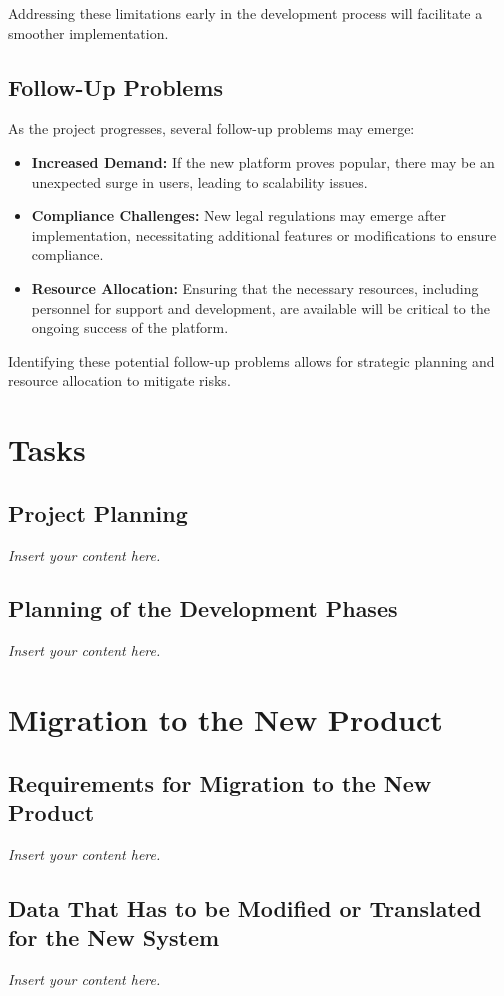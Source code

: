 \documentclass[12pt]{article}
\newcommand{\lips}{\textit{Insert your content here.}}
\begin{document}
Addressing these limitations early in the development process will facilitate a smoother implementation.

\subsection{Follow-Up Problems}
As the project progresses, several follow-up problems may emerge:

\begin{itemize}
    \item \textbf{Increased Demand:} If the new platform proves popular, there may be an unexpected surge in users, leading to scalability issues.
    \item \textbf{Compliance Challenges:} New legal regulations may emerge after implementation, necessitating additional features or modifications to ensure compliance.
    \item \textbf{Resource Allocation:} Ensuring that the necessary resources, including personnel for support and development, are available will be critical to the ongoing success of the platform.
\end{itemize}

Identifying these potential follow-up problems allows for strategic planning and resource allocation to mitigate risks.


\section{Tasks}
\subsection{Project Planning}
\lips
\subsection{Planning of the Development Phases}
\lips

\section{Migration to the New Product}
\subsection{Requirements for Migration to the New Product}
\lips
\subsection{Data That Has to be Modified or Translated for the New System}
\lips
\end{document}
